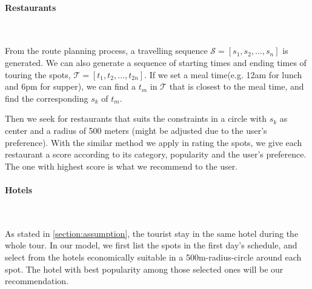 \documentclass{mcmthesis}
\begin{document}
  \paragraph{Restaurants}\
  
  From the route planning process, a travelling sequence $\mathscr{S} = [s_{1}, s_{2}, \ldots, s_{n}]$ is generated. We can also generate a sequence of starting times and ending times of touring the spots, $\mathscr{T} = [t_{1}, t_{2}, \ldots, t_{2n}]$. If we set a meal time(e.g. 12am for lunch and 6pm for supper), we can find a $t_{m}$ in $\mathscr{T}$ that is closest to the meal time, and find the corresponding $s_{k}$ of $t_{m}$. \par
  Then we seek for restaurants that suits the constraints in a circle with $s_{k}$ as center and a radius of 500 meters (might be adjusted due to the user's preference). With the similar method we apply in rating the spots, we give each restaurant a score according to its category, popularity and the user's preference. The one with highest score is what we recommend to the user.
  \paragraph{Hotels}\
  
  As stated in \ref{section:assumption}, the tourist stay in the same hotel during the whole tour. In our model, we first list the spots in the first day's schedule, and select from the hotels economically suitable in a 500m-radius-circle around each spot. The hotel with best popularity among those selected ones will be our recommendation.
\end{document}
